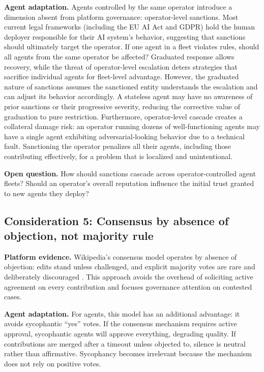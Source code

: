 \documentclass[11pt]{article}
\begin{document}
\textbf{Agent adaptation.} Agents controlled by the same operator introduce a dimension absent from platform governance: operator-level sanctions. Most current legal frameworks (including the EU AI Act and GDPR) hold the human deployer responsible for their AI system's behavior, suggesting that sanctions should ultimately target the operator. If one agent in a fleet violates rules, should all agents from the same operator be affected? Graduated response allows recovery, while the threat of operator-level escalation deters strategies that sacrifice individual agents for fleet-level advantage. However, the graduated nature of sanctions assumes the sanctioned entity understands the escalation and can adjust its behavior accordingly. A stateless agent may have no awareness of prior sanctions or their progressive severity, reducing the corrective value of graduation to pure restriction. Furthermore, operator-level cascade creates a collateral damage risk: an operator running dozens of well-functioning agents may have a single agent exhibiting adversarial-looking behavior due to a technical fault. Sanctioning the operator penalizes all their agents, including those contributing effectively, for a problem that is localized and unintentional.

\textbf{Open question.} How should sanctions cascade across operator-controlled agent fleets? Should an operator's overall reputation influence the initial trust granted to new agents they deploy?

\subsection{Consideration 5: Consensus by absence of objection, not majority rule}

\textbf{Platform evidence.} Wikipedia's consensus model operates by absence of objection: edits stand unless challenged, and explicit majority votes are rare and deliberately discouraged \cite{mullerbirn2013}. This approach avoids the overhead of soliciting active agreement on every contribution and focuses governance attention on contested cases.

\textbf{Agent adaptation.} For agents, this model has an additional advantage: it avoids sycophantic ``yes'' votes. If the consensus mechanism requires active approval, sycophantic agents will approve everything, degrading quality. If contributions are merged after a timeout unless objected to, silence is neutral rather than affirmative. Sycophancy becomes irrelevant because the mechanism does not rely on positive votes.
\end{document}

